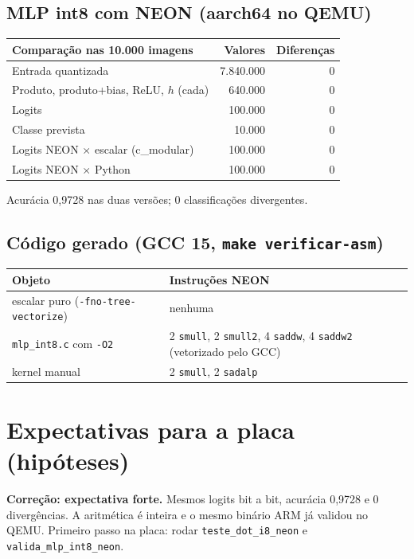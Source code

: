 \documentclass[10pt]{article}
\begin{document}
\subsection{MLP int8 com NEON (aarch64 no QEMU)}
\begin{center}\footnotesize
\begin{tabular}{@{}lrr@{}}
\toprule
Comparação nas 10.000 imagens & Valores & Diferenças \\
\midrule
Entrada quantizada & 7.840.000 & 0 \\
Produto, produto+bias, ReLU, $h$ (cada) & 640.000 & 0 \\
Logits & 100.000 & 0 \\
Classe prevista & 10.000 & 0 \\
Logits NEON $\times$ escalar (c\_modular) & 100.000 & 0 \\
Logits NEON $\times$ Python & 100.000 & 0 \\
\bottomrule
\end{tabular}
\end{center}
Acurácia 0,9728 nas duas versões; 0 classificações divergentes.

\subsection{Código gerado (GCC 15, \texttt{make verificar-asm})}
\begin{center}\footnotesize
\begin{tabularx}{\linewidth}{@{}l L@{}}
\toprule
Objeto & Instruções NEON \\
\midrule
escalar puro (\texttt{-fno-tree-vectorize}) & nenhuma \\
\texttt{mlp\_int8.c} com \texttt{-O2} & 2 \texttt{smull}, 2 \texttt{smull2}, 4 \texttt{saddw}, 4 \texttt{saddw2} (vetorizado pelo GCC) \\
kernel manual & 2 \texttt{smull}, 2 \texttt{sadalp} \\
\bottomrule
\end{tabularx}
\end{center}

\section{Expectativas para a placa (hipóteses)}
\label{sec:placa}

\textbf{Correção: expectativa forte.} Mesmos logits bit a bit, acurácia 0,9728 e 0 divergências. A
aritmética é inteira e o mesmo binário ARM já validou no QEMU. Primeiro passo na placa: rodar
\texttt{teste\_dot\_i8\_neon} e \texttt{valida\_mlp\_int8\_neon}.
\end{document}
